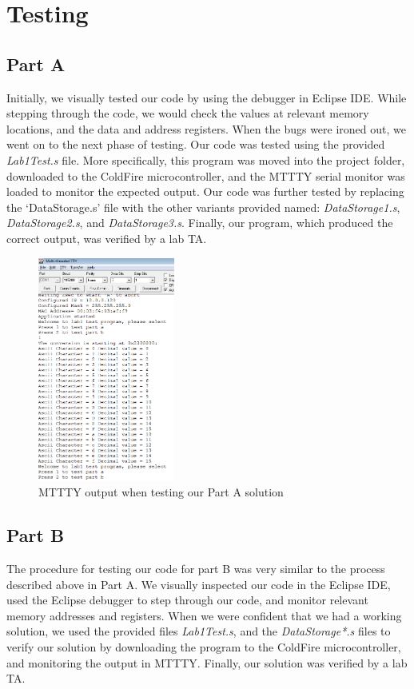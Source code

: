 \documentclass[letterpaper]{article}
\begin{document}
\section{Testing}
  \subsection{Part A}
    Initially, we visually tested our code by using the debugger in Eclipse IDE.
    While stepping through the code, we would check the values at relevant memory
    locations, and the data and address registers. When the bugs were ironed out,
    we went on to the next phase of testing.
    Our code was tested using the provided \textit{Lab1Test.s} file. More specifically,
    this program was moved into the project folder, downloaded to the ColdFire microcontroller,
    and the MTTTY serial monitor was loaded to monitor the expected output. Our code was
    further tested by replacing the `DataStorage.s' file with the other variants provided
    named: \textit{DataStorage1.s}, \textit{DataStorage2.s}, and \textit{DataStorage3.s}.
    Finally, our program, which produced the correct output, was verified by a lab TA.

    \begin{figure}[h!]
      \centering
      \includegraphics[width=0.4\textwidth]{tst1a.png}
      \caption{MTTTY output when testing our Part A solution}
    \end{figure}

  \subsection{Part B}
    The procedure for testing our code for part B was very similar to the process
    described above in Part A. We visually inspected our code in the Eclipse IDE,
    used the Eclipse debugger to step through our code, and monitor relevant
    memory addresses and registers. When we were confident that we had a working
    solution, we used the provided files \textit{Lab1Test.s}, and the \textit{DataStorage*.s}
    files to verify our solution by downloading the program to the ColdFire microcontroller,
    and monitoring the output in MTTTY. Finally, our solution was verified by a lab TA.
\end{document}
